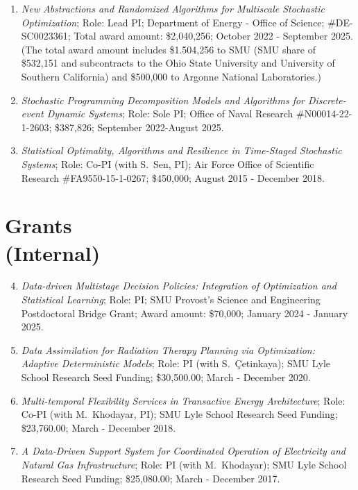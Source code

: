 \documentclass[hyperref, margin]{myResume}
\newif\ifpublic
\begin{document}
\begin{resume}
\begin{enumerate}[label=G\arabic*., leftmargin=*]
	\item \emph{New Abstractions and Randomized Algorithms for Multiscale Stochastic Optimization}; Role: Lead PI; Department of Energy - Office of Science; \#DE-SC0023361; Total award amount: \$2,040,256; October 2022 - September 2025.\ifpublic \else \\
	(The total award amount includes \$1.504,256 to SMU (SMU share of \$532,151 and subcontracts to the Ohio State University and University of Southern California) and \$500,000 to Argonne National Laboratories.) \fi

	\item \emph{Stochastic Programming Decomposition Models and Algorithms for Discrete-event Dynamic Systems}; Role: Sole PI; Office of Naval Research \#N00014-22-1-2603; \$387,826; September 2022-August 2025.

	\item \emph{Statistical Optimality, Algorithms and Resilience in Time-Staged Stochastic Systems}; Role: Co-PI (with S.\ Sen, PI); Air Force Office of Scientific Research \#FA9550-15-1-0267; \$450,000; August 2015 - December 2018.
\end{enumerate}

\section{Grants\\(Internal)}
\begin{enumerate}[label=G\arabic*., leftmargin=*] \setcounter{enumi}{3}

	\item \emph{Data-driven Multistage Decision Policies: Integration of Optimization and Statistical Learning}; Role: PI; SMU Provost's Science and Engineering Postdoctoral Bridge Grant; Award amount: \$70,000; January 2024 - January 2025.

	\item \emph{Data Assimilation for Radiation Therapy Planning via Optimization: Adaptive Deterministic Models}; Role: PI (with S.\ \c{C}etinkaya); SMU Lyle School Research Seed Funding; \$30,500.00; March - December 2020.

	\item \emph{Multi-temporal Flexibility Services in Transactive Energy Architecture}; Role: Co-PI (with M.\ Khodayar, PI); SMU Lyle School Research Seed Funding; \$23,760.00; March - December 2018.

	\item \emph{A Data-Driven Support System for Coordinated Operation of Electricity and Natural Gas Infrastructure}; Role: PI (with M.\ Khodayar); SMU Lyle School Research Seed Funding; \$25,080.00; March - December 2017.
\end{enumerate}


\end{resume}
\end{document}
